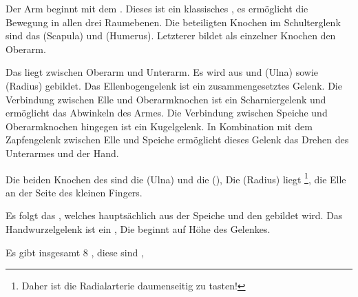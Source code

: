 {%
\label{topic:obere-extremitaet}%
Der Arm beginnt mit dem . Dieses ist ein
klassisches , es ermöglicht die Bewegung in
allen drei Raumebenen. Die beteiligten Knochen im
Schulterglenk sind das  (Scapula) und
 (Humerus). Letzterer bildet als einzelner
Knochen den Oberarm.

Das  liegt zwischen Oberarm und
Unterarm. Es wird aus  und 
(Ulna) sowie  (Radius) gebildet. Das
Ellenbogengelenk ist ein zusammengesetztes Gelenk. Die
Verbindung zwischen Elle und Oberarmknochen ist ein
Scharniergelenk und ermöglicht das Abwinkeln des Armes. Die
Verbindung zwischen Speiche und Oberarmknochen hingegen ist
ein Kugelgelenk. In Kombination mit dem Zapfengelenk
zwischen Elle und Speiche ermöglicht dieses Gelenk das
Drehen des Unterarmes und der Hand.

Die beiden Knochen des  sind die 
(Ulna) und die  (),  Die
 (Radius) liegt \footnote{Daher
ist die Radialarterie daumenseitig zu tasten!}, die Elle an
der Seite des kleinen Fingers.

Es folgt das , welches hauptsächlich
aus der Speiche und den  gebildet wird.
Das Handwurzelgelenk ist ein , 
Die  beginnt auf Höhe des Gelenkes.

Es gibt insgesamt 8 ,
diese sind , 

}
